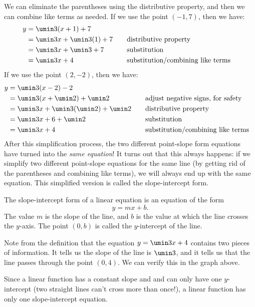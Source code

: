 We can eliminate the parentheses using the distributive property, and then we can combine like terms as needed. If we use the point $(-1,7)$, then we have:
\[\begin{aligned}
y 	& = \umin3(x + 1) + 7\\
	& =\umin3x + \umin3(1) + 7
&& \text{\quad distributive property}\\
	& = \umin3x + \umin3 + 7
&& \text{\quad substitution}\\
	& = \umin3x + 4
&& \text{\quad substitution/combining like terms}
\end{aligned}
\]
If we use the point $(2,-2)$, then we have:
\[\begin{aligned}
y 	& = \umin3(x - 2) - 2\\
	& =\umin3(x + \umin2) + \umin2
&& \text{\quad adjust negative signs, for safety}\\
	& =\umin3x + \umin3(\umin2) + \umin2
&& \text{\quad distributive property}\\
	& = \umin3x + 6 + \umin2
&& \text{\quad substitution}\\
	& = \umin3x + 4
&& \text{\quad substitution/combining like terms}
\end{aligned}
\]
After this simplification process, the two different point-slope form equations have turned into the \textit{same equation}! It turns out that this always happens: if we simplify two different point-slope equations for the same line (by getting rid of the parentheses and combining like terms), we will always end up with the same equation. This simplified version is called the \gls{slope-intercept form}.

\begin{boxdef}
The \gls{slope-intercept form} of a linear equation is an equation of the form \[y = mx +b.\] The value $m$ is the slope of the line, and $b$ is the value at which the line crosses the $y$-axis. The point $(0,b)$ is called the $y$-intercept of the line.
\end{boxdef}

Note from the definition that the equation $y=\umin3x + 4$ contains two pieces of information. It tells us the slope of the line is $\umin3$, and it tells us that the line passes through the point $(0,4)$. We can verify this in the graph above.

Since a linear function has a constant slope and and can only have one $y$-intercept (two straight lines can't cross more than once!), a linear function has only one slope-intercept equation.

